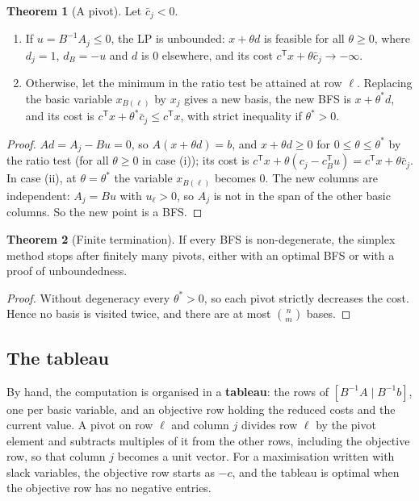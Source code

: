 \documentclass[11pt,a4paper]{article}
\numberwithin{equation}{section}
\theoremstyle{definition}
\newtheorem{thm}{Theorem}[subsection]
\begin{document}
\begin{thm}[A pivot]
\label{thm:pivot}
Let $\bar c_j < 0$.
\begin{enumerate}[label=(\roman*)]
\item If $u = B^{-1}A_j \leq 0$, the LP is unbounded: $x + \theta d$ is feasible for all $\theta \geq 0$, where $d_j = 1$, $d_B = -u$ and $d$ is $0$ elsewhere, and its cost $c^{\mathsf T}x + \theta\bar c_j \to -\infty$.
\item Otherwise, let the minimum in the ratio test be attained at row $\ell$. Replacing the basic variable $x_{B(\ell)}$ by $x_j$ gives a new basis, the new BFS is $x + \theta^*d$, and its cost is $c^{\mathsf T}x + \theta^*\bar c_j \leq c^{\mathsf T}x$, with strict inequality if $\theta^* > 0$.
\end{enumerate}
\end{thm}

\begin{proof}
$Ad = A_j - Bu = 0$, so $A(x + \theta d) = b$, and $x + \theta d \geq 0$ for $0 \leq \theta \leq \theta^*$ by the ratio test (for all $\theta \geq 0$ in case (i)); its cost is $c^{\mathsf T}x + \theta(c_j - c_B^{\mathsf T}u) = c^{\mathsf T}x + \theta\bar c_j$. In case (ii), at $\theta = \theta^*$ the variable $x_{B(\ell)}$ becomes $0$. The new
columns are independent: $A_j = Bu$ with $u_\ell > 0$, so $A_j$ is not in the span of the other basic columns. So the new point is a BFS.
\end{proof}

\begin{thm}[Finite termination]
\label{thm:termination}
If every BFS is non-degenerate, the simplex method stops after finitely many pivots, either with an optimal BFS or with a proof of unboundedness.
\end{thm}

\begin{proof}
Without degeneracy every $\theta^* > 0$, so each pivot strictly decreases the cost. Hence no basis is visited twice, and there are at most $\binom nm$ bases.
\end{proof}

\subsection{The tableau}
\label{ssec:tableau}

By hand, the computation is organised in a \textbf{tableau}: the rows of $[B^{-1}A \mid B^{-1}b]$, one per basic variable, and an objective row holding the reduced costs and the current value. A pivot on row $\ell$ and column $j$ divides row $\ell$ by the pivot element and subtracts multiples of it from the other rows,
including the objective row, so that column $j$ becomes a unit vector. For a maximisation written with slack variables, the objective row starts as $-c$, and the tableau is optimal when the objective row has no negative entries.
\end{document}
